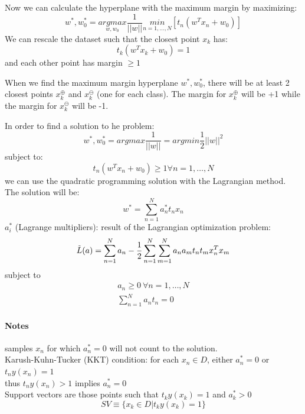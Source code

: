 Now we can calculate the hyperplane with the maximum margin by maximizing:
\begin{equation}
    w^{*}, w_{0}^{*} = \underset{w, w_{0}}{argmax} \frac{1}{||w||} \underset{n=1, \dots , N}{min} [t_{n}(w^{T}x_{n} + w_{0})]
\end{equation}
We can rescale the dataset such that the closest point $x_{k}$ has:
\begin{equation}
    t_{k}(w^{T}x_{k} + w_{0}) = 1
\end{equation}
and each other point has margin $\geq 1$

When we find the maximum margin hyperplane $w^{*}, w_{0}^{*}$, there will be at least 2 closest points $x_{k}^{\oplus}$ and $x_{k}^{\ominus}$ (one for each class).
The margin for $x_{k}^{\oplus}$ will be +1 while the margin for $x_{k}^{\ominus}$ will be -1.

In order to find a solution to he problem:
\begin{equation}
    w^{*}, w_{0}^{*} = argmax \frac{1}{||w||} = argmin \frac{1}{2} ||w||^{2}
\end{equation}
subject to:
\begin{equation}
    t_{n}(w^{T}x_{n} + w_{0}) \geq 1 \forall n = 1, \dots, N
\end{equation}
we can use the quadratic programming solution with the Lagrangian method.
The solution will be:
\begin{equation}
    w^{*} = \sum_{n=1}^{N} a_{n}^{*}t_{n}x_{n}
\end{equation}
$a_{i}^{*}$ (Lagrange multipliers): result of the Lagrangian optimization problem:
\begin{equation}
    \Tilde{L}(a) = \sum_{n=1}^{N}a_{n} - \frac{1}{2} \sum_{n=1}^{N}\sum_{m=1}^{N}a_{n}a_{m}t_{n}t_{m}x_{n}^{T}x_{m}
\end{equation}
subject to
\begin{equation}
    \begin{multlined}
        a_{n} \geq 0 \ \forall n = 1, \dots, N \\
        \sum_{n=1}^{N}a_{n}t_{n} = 0
    \end{multlined}
\end{equation}

\paragraph{Notes}
samples $x_{n}$ for which $a_{n}^{*} = 0$ will not count to the solution. \\
Karush-Kuhn-Tucker (KKT) condition:
for each $x_{n} \in D$, either $a_{n}^{*} = 0$ or $t_{n}y(x_{n}) = 1$ \\
thus $t_{n}y(x_{n}) > 1$ implies $a_{n}^{*} = 0$ \\
Support vectors are those points such that $t_{k}y(x_{k}) = 1$ and $a_{k}^{*} > 0$
\begin{equation}
    SV \equiv \{x_{k} \in D | t_{k}y(x_{k}) = 1\}
\end{equation}

